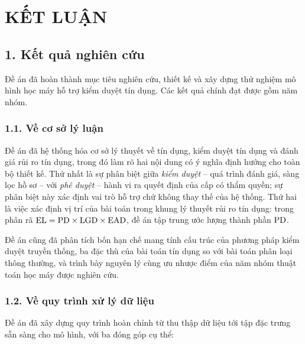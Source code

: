 \chapter*{KẾT LUẬN}

\section*{1. Kết quả nghiên cứu}

Đề án đã hoàn thành mục tiêu nghiên cứu, thiết kế và xây dựng thử nghiệm mô hình
học máy hỗ trợ kiểm duyệt tín dụng. Các kết quả chính đạt được
gồm năm nhóm.

\subsection*{1.1. Về cơ sở lý luận}

Đề án đã hệ thống hóa cơ sở lý thuyết về tín dụng, kiểm duyệt tín dụng và đánh
giá rủi ro tín dụng, trong đó làm rõ hai nội dung có ý nghĩa định hướng cho toàn
bộ thiết kế. Thứ nhất là sự phân biệt giữa \textit{kiểm duyệt} -- quá trình đánh
giá, sàng lọc hồ sơ -- với \textit{phê duyệt} -- hành vi ra quyết định của cấp có
thẩm quyền; sự phân biệt này xác định vai trò hỗ trợ chứ không thay thế của hệ
thống. Thứ hai là việc xác định vị trí của bài toán trong khung lý thuyết rủi ro
tín dụng: trong phân rã $\mathrm{EL} = \mathrm{PD} \times \mathrm{LGD} \times \mathrm{EAD}$, đề án tập trung ước
lượng thành phần $\mathrm{PD}$.

Đề án cũng đã phân tích bốn hạn chế mang tính cấu trúc của phương pháp kiểm duyệt
truyền thống, ba đặc thù của bài toán tín dụng so với bài toán phân loại thông
thường, và trình bày nguyên lý cùng ưu nhược điểm của năm nhóm thuật toán học máy
được nghiên cứu.

\subsection*{1.2. Về quy trình xử lý dữ liệu}

Đề án đã xây dựng quy trình hoàn chỉnh từ thu thập dữ liệu tới tập đặc trưng sẵn
sàng cho mô hình, với ba đóng góp cụ thể:

